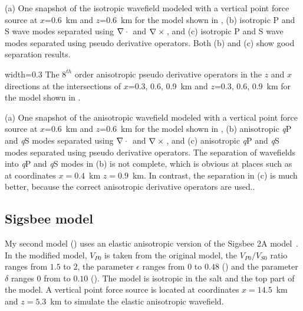 {(a) One snapshot of the isotropic wavefield modeled with a vertical
point force source at $x$=0.6~km and $z$=0.6~km for the model shown in
{, (b) isotropic P and S wave modes
separated using $\nabla \cdot {}$ and $\nabla \times {}$, and (c) isotropic P and S wave modes
separated using pseudo derivative operators. Both (b) and (c) show good separation
results.}}

{width=0.3\textwidth} {The $8^{th}$ order anisotropic pseudo
derivative operators in the $z$ and $x$ directions at the
intersections of $x$=0.3, 0.6, 0.9~km and $z$=0.3, 0.6, 0.9~km for 
the model shown in {}.
}



{(a) One snapshot of the anisotropic wavefield modeled with a vertical
point force source at $x$=0.6~km and $z$=0.6~km for the model shown in
{}, (b) anisotropic {\it q}P
and {\it q}S modes separated using $\nabla \cdot {}$ and $\nabla \times {}$, and (c)
anisotropic {\it q}P and {\it q}S modes separated using pseudo
derivative operators.  The separation of wavefields into {\it q}P and
{\it q}S modes in (b) is not complete, which is obvious at places such
as at coordinates $x=0.4$~km $z=0.9$~km. In contrast, the separation
in (c) is {much better, because the correct
anisotropic derivative operators are used.}.  }




\subsection{Sigsbee model}
My second model () uses an
elastic anisotropic version of the Sigsbee 2A
model~\cite[]{SEG-2002-21222125}. In the modified model, $V_{P0}$ 
is taken from the original model, the $V_{P0}/V_{S0}$ ratio ranges
from $1.5$ to $2$, the parameter $\epsilon$ ranges from $0$ to $0.48$
() and the parameter $\delta$ ranges $0$ from to
$0.10$ (). The model is isotropic in the salt and
the top part of the model. A vertical point force source is located at
coordinates $x=14.5$~km and $z=5.3$~km to simulate the elastic
anisotropic wavefield.


